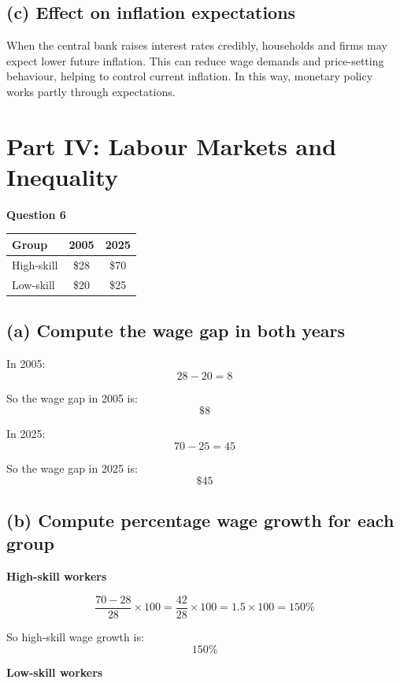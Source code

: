 \documentclass[12pt]{article}
\begin{document}
\subsection*{(c) Effect on inflation expectations}

When the central bank raises interest rates credibly, households and firms may expect lower future inflation. This can reduce wage demands and price-setting behaviour, helping to control current inflation. In this way, monetary policy works partly through expectations.

\section*{Part IV: Labour Markets and Inequality}

\textbf{Question 6}

\begin{center}
\begin{tabular}{lcc}
\toprule
Group & 2005 & 2025 \\
\midrule
High-skill & \$28 & \$70 \\
Low-skill & \$20 & \$25 \\
\bottomrule
\end{tabular}
\end{center}

\subsection*{(a) Compute the wage gap in both years}

In 2005:
\[
28 - 20 = 8
\]

So the wage gap in 2005 is:
\[
\boxed{\$8}
\]

In 2025:
\[
70 - 25 = 45
\]

So the wage gap in 2025 is:
\[
\boxed{\$45}
\]

\subsection*{(b) Compute percentage wage growth for each group}

\textbf{High-skill workers}

\[
\frac{70 - 28}{28} \times 100
=
\frac{42}{28} \times 100
= 1.5 \times 100 = 150\%
\]

So high-skill wage growth is:
\[
\boxed{150\%}
\]

\textbf{Low-skill workers}
\end{document}
